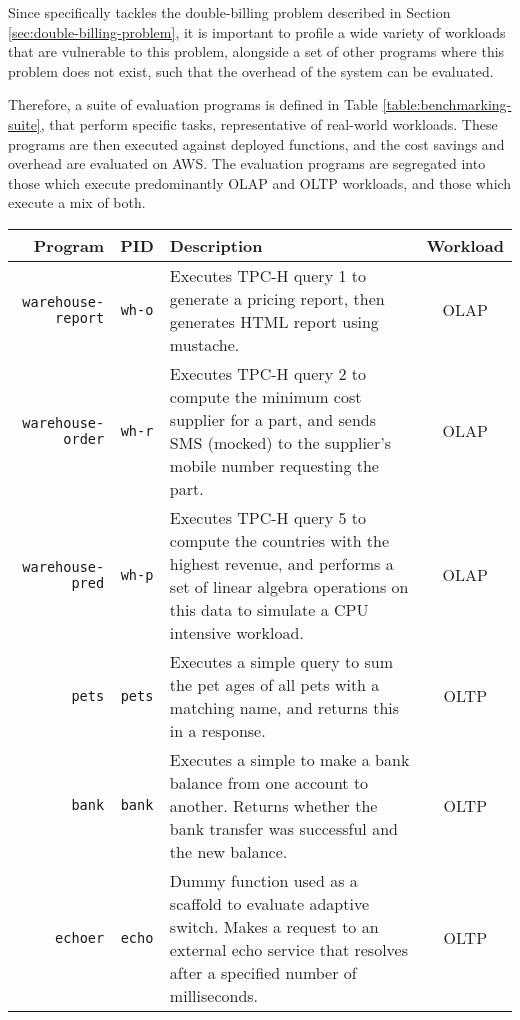 Since \faaas{} specifically tackles the double-billing problem described in Section \ref{sec:double-billing-problem}, it is important to profile a wide variety of workloads that are vulnerable to this problem, alongside a set of other programs where this problem does not exist, such that the overhead of the system can be evaluated.

Therefore, a suite of evaluation programs is defined in Table \ref{table:benchmarking-suite}, that perform specific tasks, representative of real-world workloads. These programs are then executed against deployed \faaas{} functions, and the cost savings and overhead are evaluated on AWS. The evaluation programs are segregated into those which execute predominantly OLAP and OLTP workloads, and those which execute a mix of both.

\begin{table*}
\begin{tabularx}{\linewidth}{|r|c|X|c|}
    \hline
    \textbf{Program} & \textbf{PID} & \textbf{Description} & \textbf{Workload} \\
    \hline
    \verb|warehouse-report| & \verb|wh-o| & Executes TPC-H query 1 to generate a pricing report, then generates HTML report using mustache. & OLAP \\
    \hline
    \verb|warehouse-order| & \verb|wh-r| & Executes TPC-H query 2 to compute the minimum cost supplier for a part, and sends SMS (mocked) to the supplier's mobile number requesting the part.  & OLAP \\
    \hline
    \verb|warehouse-pred| & \verb|wh-p| & Executes TPC-H query 5 to compute the countries with the highest revenue, and performs a set of linear algebra operations on this data to simulate a CPU intensive workload. & OLAP \\
    \hline
    \verb|pets| & \verb|pets| & Executes a simple query to sum the pet ages of all pets with a matching name, and returns this in a response. & OLTP \\
    \hline
    \verb|bank| & \verb|bank| & Executes a simple to make a bank balance from one account to another. Returns whether the bank transfer was successful and the new balance. & OLTP \\
    \hline
    \verb|echoer| & \verb|echo| & Dummy function used as a scaffold to evaluate adaptive switch. Makes a request to an external echo service that resolves after a specified number of milliseconds. & OLTP \\
    \hline
\end{tabularx}
\caption{Suite of benchmarking programs used to evaluate \faaas{}}
\label{table:benchmarking-suite}
\end{table*}

